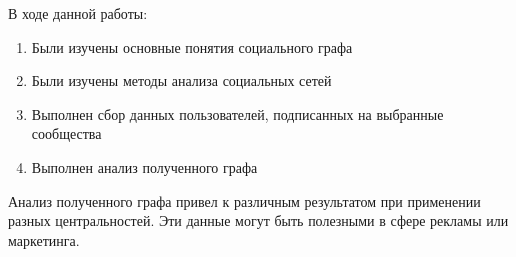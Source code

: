 В ходе данной работы:
\begin{enumerate}
    \item Были изучены основные понятия социального графа
    \item Были изучены методы анализа социальных сетей
    \item Выполнен сбор данных пользователей, подписанных на выбранные сообщества
    \item Выполнен анализ полученного графа
\end{enumerate}

Анализ полученного графа привел к различным результатом при применении разных центральностей. Эти данные могут быть полезными в сфере рекламы или маркетинга. 